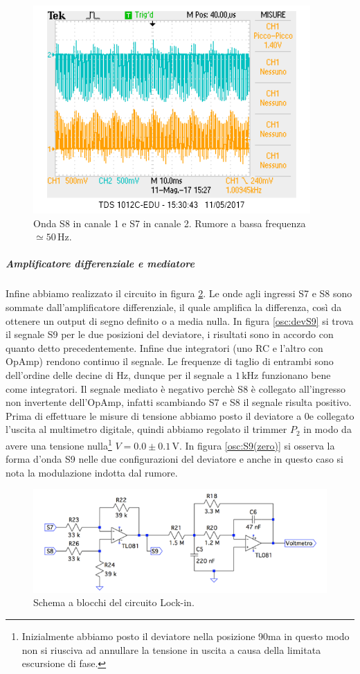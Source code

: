 \documentclass[10pt,a4paper]{article}
\begin{document}
\begin{figure}[!htb]
  \centering
  \includegraphics[scale=0.75]{perFedech1S8-ch2S7.png}
\caption{Onda S8 in canale 1 e S7 in canale 2. Rumore a bassa frequenza $\simeq 50\,\mbox{Hz}$.\label{osc:rumore50hz}}
\end{figure}


\subparagraph{Amplificatore differenziale e mediatore}
Infine abbiamo realizzato il circuito in figura \ref{fig:amplificatorediff-mediatore}. Le onde agli ingressi S7 e S8 sono sommate dall'amplificatore differenziale, il quale amplifica la differenza, così da ottenere un output di segno definito o a media nulla. In figura \ref{osc:devS9} si trova il segnale S9 per le due posizioni del deviatore, i risultati sono in accordo con quanto detto precedentemente.
Infine due integratori (uno RC e l'altro con OpAmp) rendono continuo il segnale. Le frequenze di taglio di entrambi sono dell'ordine delle decine di Hz, dunque per il segnale a $1\,\mbox{kHz}$ funzionano bene come integratori. Il segnale mediato è negativo perchè S8 è collegato all'ingresso non invertente dell'OpAmp, infatti scambiando S7 e S8 il segnale risulta positivo. Prima di effettuare le misure di tensione abbiamo posto il deviatore a 0\degree e collegato l'uscita al multimetro digitale, quindi abbiamo regolato il trimmer $P_2$ in modo da avere una tensione nulla\footnote{Inizialmente abbiamo posto il deviatore nella posizione 90\degree ma in questo modo non si riusciva ad annullare la tensione in uscita a causa della limitata escursione di fase.} $V=0.0\pm0.1\,\mbox{V}$. In figura \ref{osc:S9(zero)} si osserva la forma d'onda S9 nelle due configurazioni del deviatore e anche in questo caso si nota la modulazione indotta dal rumore.

\begin{figure}[!htb]
  \centering
  \includegraphics[scale=0.75]{amplificatorediff-mediatore.png}
\caption{Schema a blocchi del circuito Lock-in.\label{fig:amplificatorediff-mediatore}}
\end{figure}
\end{document}
